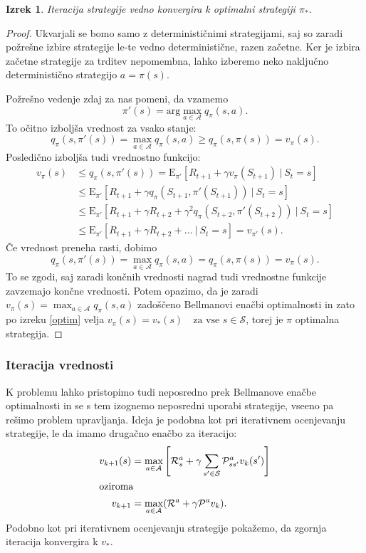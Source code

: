 \documentclass[12pt,a4paper]{amsart}
\theoremstyle{definition} %
\theoremstyle{plain} %
\newtheorem{izrek}[definicija]{Izrek}
\begin{document}
\begin{izrek}\label{iterKonv}
    Iteracija strategije vedno konvergira k optimalni strategiji $\pi_*$.
\end{izrek}

\begin{proof}
    Ukvarjali se bomo samo z determinističnimi strategijami, saj so zaradi požrešne izbire 
    strategije le-te vedno deterministične, razen začetne. Ker je izbira začetne strategije za 
    trditev nepomembna, lahko izberemo neko naključno deterministično strategijo $a = \pi(s)$.

    Požrešno vedenje zdaj za nas pomeni, da vzamemo 
    \begin{equation}\label{pozresno}
        \pi'(s) = \text{arg}\max_{a \in \mathcal{A}} q_\pi(s, a).
    \end{equation}
    To očitno izboljša vrednost za vsako stanje:
    $$
    q_\pi(s, \pi'(s)) = \max_{a \in \mathcal{A}} q_\pi(s, a) \geq q_\pi(s, \pi(s)) = v_\pi(s).
    $$
    Posledično izboljša tudi vrednostno funkcijo: 
    \begin{align*}
        v_\pi(s) &\leq q_\pi(s, \pi'(s)) = \mathrm{E}_{\pi'} [R_{t+1} + 
            \gamma v_\pi(S_{t+1})~|~S_t = s] \\
        &\leq \mathrm{E}_{\pi'} [R_{t+1} + \gamma q_\pi(S_{t+1}, \pi'(S_{t+1}))~|~S_t = s] \\
        &\leq \mathrm{E}_{\pi'} [R_{t+1} + \gamma R_{t+2} + 
            \gamma^2 q_\pi(S_{t+2}, \pi'(S_{t+2}))~|~S_t = s] \\
        &\leq \mathrm{E}_{\pi'} [R_{t+1} + \gamma R_{t+2} + \dots~|~S_t = s] = v_{\pi'}(s).
    \end{align*}
Če vrednost preneha rasti, dobimo 
$$
q_\pi(s, \pi'(s)) = \max_{a \in \mathcal{A}} q_\pi(s, a) = q_\pi(s, \pi(s)) = v_\pi(s).
$$
To se zgodi, saj zaradi končnih vrednosti nagrad tudi vrednostne funkcije zavzemajo končne vrednosti. 
Potem opazimo, da je zaradi $v_\pi(s) = \max_{a \in \mathcal{A}} q_\pi(s, a)$ zadoščeno Bellmanovi 
enačbi optimalnosti in zato po izreku \ref{optim} velja $v_\pi(s) = 
v_*(s) \text{ } \text{ za vse } s \in \mathcal{S}$, torej je $\pi$ optimalna strategija.
\end{proof}

\subsubsection{Iteracija vrednosti}
K problemu lahko pristopimo tudi neposredno prek Bellmanove enačbe optimalnosti in se s tem 
izognemo neposredni uporabi strategije, vseeno pa rešimo problem upravljanja. Ideja je podobna kot 
pri iterativnem ocenjevanju strategije, le da imamo drugačno enačbo za iteracijo: 
\begin{align*}
    v_{k+1}(s) &= \max_{a \in \mathcal{A}} \left[ \mathcal{R}_s^a + 
        \gamma \sum_{s' \in \mathcal{S}} \mathcal{P}_{ss'}^a v_k(s') \right] \\
    \intertext{oziroma}
    v_{k+1} &= \max_{a \in \mathcal{A}} (\mathcal{R}^a + \gamma \mathcal{P}^a v_k).
\end{align*}
Podobno kot pri iterativnem ocenjevanju strategije pokažemo, da zgornja iteracija konvergira k 
$v_*$.
\end{document}
